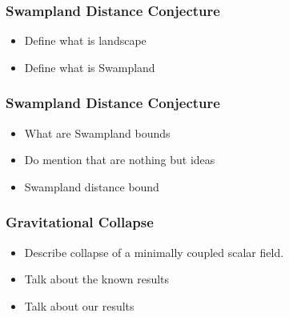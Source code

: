 \documentclass[hyperref={bookmarks=false},aspectratio=169]{beamer}
\begin{document}
\begin{frame}
  \frametitle{Swampland Distance Conjecture}
  \begin{itemize}
    \item Define what is landscape
    \item Define what is Swampland
  \end{itemize}

\end{frame}


\begin{frame}
  \frametitle{Swampland Distance Conjecture}
  \begin{itemize}
    \item What are Swampland bounds
    \item Do mention that are nothing but ideas
    \item Swampland distance bound
  \end{itemize}

\end{frame}

\begin{frame}
  \frametitle{Gravitational Collapse}

  \begin{itemize}
    \item Describe collapse of a minimally coupled scalar field.
    \item Talk about the known results
    \item Talk about our results
  \end{itemize}

\end{frame}
\end{document}
